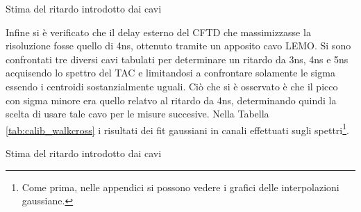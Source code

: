 

\begin{table}[h]
	\centering
	
	\caption{Stima del ritardo introdotto dai cavi}
	\label{tab:calib_cavi}
\end{table}
 
Infine si è verificato che il delay esterno del CFTD che massimizzasse la risoluzione fosse quello di 4ns, ottenuto tramite un apposito cavo LEMO. Si sono confrontati tre diversi cavi
tabulati per determinare un ritardo da 3ns, 4ns e 5ns acquisendo lo spettro del TAC e limitandosi a confrontare solamente le sigma essendo i centroidi sostanzialmente uguali. Ciò che si 
è osservato è che il picco con sigma minore era quello relatvo al ritardo da 4ns, determinando quindi la scelta di usare tale cavo per le misure succesive. Nella Tabella \ref{tab:calib_walkcross}
i risultati dei fit gaussiani in canali effettuati sugli spettri\footnote{Come prima, nelle appendici si possono vedere i grafici delle interpolazioni gaussiane.}. \\

\begin{table}[h]
	\centering
	
	\caption{Stima del ritardo introdotto dai cavi}
	\label{tab:calib_walkcross}
\end{table}



